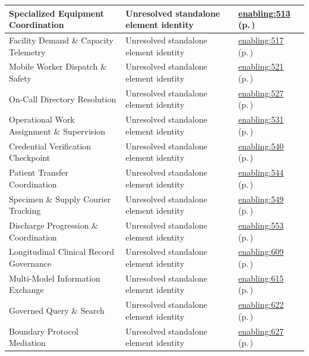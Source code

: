 \begin{longtable}{|>{\raggedright\arraybackslash}p{0.38\TableWidth}|>{\raggedright\arraybackslash}p{0.27\TableWidth}|>{\raggedright\arraybackslash}p{0.35\TableWidth}|}
Specialized Equipment Coordination & Unresolved standalone element identity & \hyperref[rad:enabling:513]{enabling:513} (p.\,\pageref{rad:enabling:513})\\\hline
Facility Demand \& Capacity Telemetry & Unresolved standalone element identity & \hyperref[rad:enabling:517]{enabling:517} (p.\,\pageref{rad:enabling:517})\\\hline
Mobile Worker Dispatch \& Safety & Unresolved standalone element identity & \hyperref[rad:enabling:521]{enabling:521} (p.\,\pageref{rad:enabling:521})\\\hline
On-Call Directory Resolution & Unresolved standalone element identity & \hyperref[rad:enabling:527]{enabling:527} (p.\,\pageref{rad:enabling:527})\\\hline
Operational Work Assignment \& Supervision & Unresolved standalone element identity & \hyperref[rad:enabling:531]{enabling:531} (p.\,\pageref{rad:enabling:531})\\\hline
Credential Verification Checkpoint & Unresolved standalone element identity & \hyperref[rad:enabling:540]{enabling:540} (p.\,\pageref{rad:enabling:540})\\\hline
Patient Transfer Coordination & Unresolved standalone element identity & \hyperref[rad:enabling:544]{enabling:544} (p.\,\pageref{rad:enabling:544})\\\hline
Specimen \& Supply Courier Tracking & Unresolved standalone element identity & \hyperref[rad:enabling:549]{enabling:549} (p.\,\pageref{rad:enabling:549})\\\hline
Discharge Progression \& Coordination & Unresolved standalone element identity & \hyperref[rad:enabling:553]{enabling:553} (p.\,\pageref{rad:enabling:553})\\\hline
Longitudinal Clinical Record Governance & Unresolved standalone element identity & \hyperref[rad:enabling:609]{enabling:609} (p.\,\pageref{rad:enabling:609})\\\hline
Multi-Model Information Exchange & Unresolved standalone element identity & \hyperref[rad:enabling:615]{enabling:615} (p.\,\pageref{rad:enabling:615})\\\hline
Governed Query \& Search & Unresolved standalone element identity & \hyperref[rad:enabling:622]{enabling:622} (p.\,\pageref{rad:enabling:622})\\\hline
Boundary Protocol Mediation & Unresolved standalone element identity & \hyperref[rad:enabling:627]{enabling:627} (p.\,\pageref{rad:enabling:627})\\\hline

\end{longtable}
